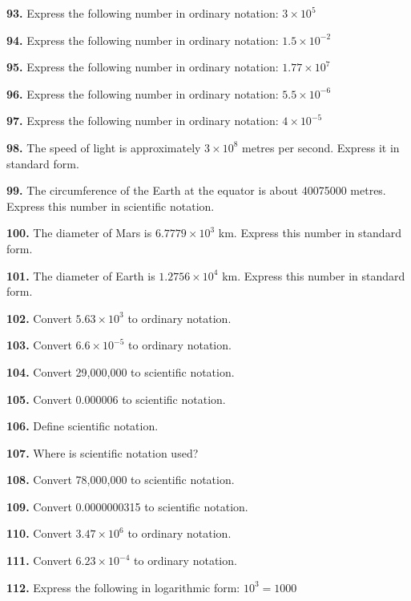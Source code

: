 \documentclass[11pt]{article}
\begin{document}
\bigskip
\noindent\textbf{93.} Express the following number in ordinary notation: $3\times10^5$

\bigskip
\noindent\textbf{94.} Express the following number in ordinary notation: $1.5\times10^{-2}$

\bigskip
\noindent\textbf{95.} Express the following number in ordinary notation: $1.77\times10^{7}$

\bigskip
\noindent\textbf{96.} Express the following number in ordinary notation: $5.5\times10^{-6}$

\bigskip
\noindent\textbf{97.} Express the following number in ordinary notation: $4\times10^{-5}$

\bigskip
\noindent\textbf{98.} The speed of light is approximately $3\times10^{8}$ metres per second. Express it in standard form.

\bigskip
\noindent\textbf{99.} The circumference of the Earth at the equator is about 40075000 metres. Express this number in scientific notation.

\bigskip
\noindent\textbf{100.} The diameter of Mars is $6.7779\times10^{3}$ km. Express this number in standard form.

\bigskip
\noindent\textbf{101.} The diameter of Earth is $1.2756\times10^{4}$ km. Express this number in standard form.

\bigskip
\noindent\textbf{102.} Convert $5.63\times10^{3}$ to ordinary notation.

\bigskip
\noindent\textbf{103.} Convert $6.6\times10^{-5}$ to ordinary notation.

\bigskip
\noindent\textbf{104.} Convert 29,000,000 to scientific notation.

\bigskip
\noindent\textbf{105.} Convert 0.000006 to scientific notation.

\bigskip
\noindent\textbf{106.} Define scientific notation.

\bigskip
\noindent\textbf{107.} Where is scientific notation used?

\bigskip
\noindent\textbf{108.} Convert 78,000,000 to scientific notation.

\bigskip
\noindent\textbf{109.} Convert 0.0000000315 to scientific notation.

\bigskip
\noindent\textbf{110.} Convert $3.47\times10^{6}$ to ordinary notation.

\bigskip
\noindent\textbf{111.} Convert $6.23\times10^{-4}$ to ordinary notation.

\bigskip
\noindent\textbf{112.} Express the following in logarithmic form: $10^3=1000$
\end{document}
